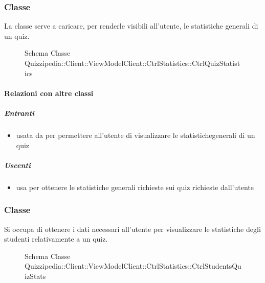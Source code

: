 \subsubsection{Classe }
La classe serve a caricare, per renderle visibili all'utente, le statistiche generali di un quiz.
\begin{figure}[H]
\centering
\noindent{}
\caption[Schema Classe CtrlQuizStatistics]{Schema Classe Quizzipedia::Client::ViewModelClient::CtrlStatistics::CtrlQuizStatistics}
\end{figure}
\paragraph{Relazioni con altre classi}
\subparagraph{Entranti}
\begin{itemize}
\item usata da  per permettere all'utente di visualizzare le statistichegenerali di un quiz
\end{itemize}
\subparagraph{Uscenti}
\begin{itemize}
\item usa  per ottenere le statistiche generali richieste sui quiz richieste dall'utente
\end{itemize}
\subsubsection{Classe }
Si occupa di ottenere i dati necessari all'utente per visualizzare le statistiche degli studenti relativamente a un quiz.
\begin{figure}[H]
\centering
\noindent{}
\caption[Schema Classe CtrlStudentsQuizStats]{Schema Classe Quizzipedia::Client::ViewModelClient::CtrlStatistics::CtrlStudentsQuizStats}
\end{figure}
